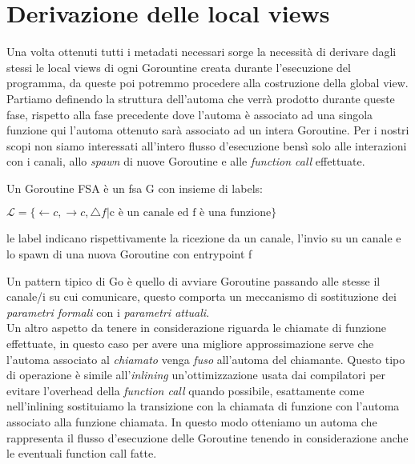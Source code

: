 \iffalse
    \subsection{Gestione degli stati finali}
\fi

\section{Derivazione delle local views}
Una volta ottenuti tutti i metadati necessari sorge la necessità di derivare dagli stessi le local views di ogni Gorountine creata durante l'esecuzione del programma, da queste poi potremmo procedere alla costruzione della global view.\bigskip\\
Partiamo definendo la struttura dell'automa che verrà prodotto durante queste fase, rispetto alla fase precedente dove l'automa è associato ad una singola funzione qui l'automa ottenuto sarà associato ad un intera Goroutine. Per i nostri scopi non siamo interessati all'intero flusso d'esecuzione bensì solo alle interazioni con i canali, allo \emph{spawn} di nuove Goroutine e alle \emph{function call} effettuate. \\
\begin{definition}
    Un Goroutine FSA è un fsa G con insieme di labels:
    \begin{center}
        $\mathcal{L} = \{ \leftarrow c, \rightarrow c, \bigtriangleup f | \text{c è un canale ed f è una funzione} \}$
    \end{center}
    le label indicano rispettivamente la ricezione da un canale, l'invio su un canale e lo spawn di una nuova Goroutine con entrypoint f
\end{definition}
Un pattern tipico di Go è quello di avviare Goroutine passando alle stesse il canale/i su cui comunicare, questo comporta un meccanismo di sostituzione dei \emph{parametri formali} con i \emph{parametri attuali}. \\
Un altro aspetto da tenere in considerazione riguarda le chiamate di funzione effettuate, in questo caso per avere una migliore approssimazione serve che l'automa associato al \emph{chiamato} venga \emph{fuso} all'automa del chiamante. Questo tipo di operazione è simile all'\emph{inlining} un'ottimizzazione usata dai compilatori per evitare l'overhead della \emph{function call} quando possibile, esattamente come nell'inlining sostituiamo la transizione con la chiamata di funzione con l'automa associato alla funzione chiamata. In questo modo otteniamo un automa che rappresenta il flusso d'esecuzione delle Goroutine tenendo in considerazione anche le eventuali function call fatte.\bigskip \\

